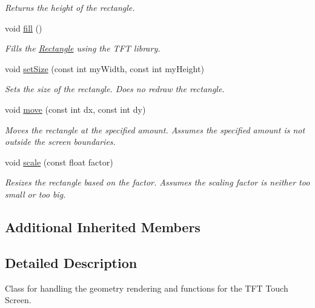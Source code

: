\begin{DoxyCompactItemize}
\begin{DoxyCompactList}\small\item\em Returns the height of the rectangle. \end{DoxyCompactList}\item 
\hypertarget{class_rectangle_a59d805919cfe95604336afb6e9d54f6f}{void \hyperlink{class_rectangle_a59d805919cfe95604336afb6e9d54f6f}{fill} ()}\label{class_rectangle_a59d805919cfe95604336afb6e9d54f6f}

\begin{DoxyCompactList}\small\item\em Fills the \hyperlink{class_rectangle}{Rectangle} using the T\+F\+T library. \end{DoxyCompactList}\item 
void \hyperlink{class_rectangle_aa6f0b3ca31c9bc2fe7094e1859e22650}{set\+Size} (const int my\+Width, const int my\+Height)
\begin{DoxyCompactList}\small\item\em Sets the size of the rectangle. Does no redraw the rectangle. \end{DoxyCompactList}\item 
void \hyperlink{class_rectangle_a834f54f7040623d8bae999580b02b2b1}{move} (const int dx, const int dy)
\begin{DoxyCompactList}\small\item\em Moves the rectangle at the specified amount. Assumes the specified amount is not outside the screen boundaries. \end{DoxyCompactList}\item 
void \hyperlink{class_rectangle_a823b01fda97c5d8d6252e526c3e1e27e}{scale} (const float factor)
\begin{DoxyCompactList}\small\item\em Resizes the rectangle based on the factor. Assumes the scaling factor is neither too small or too big. \end{DoxyCompactList}\end{DoxyCompactItemize}
\subsection*{Additional Inherited Members}


\subsection{Detailed Description}
Class for handling the geometry rendering and functions for the T\+F\+T Touch Screen. 

